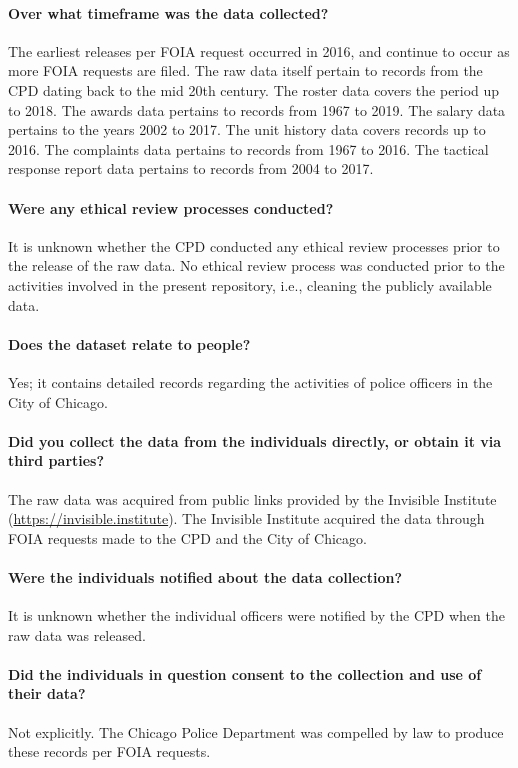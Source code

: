 \paragraph{Over what timeframe was the data collected?}
The earliest releases per FOIA request occurred in 2016, and continue to occur
as more FOIA requests are filed. The raw data itself pertain to records from the CPD
dating back to the mid 20th century. The roster data covers the period up
to 2018. The awards data pertains to records from 1967 to 2019.
The salary data pertains to the years 2002 to 2017. The unit history data covers records up
to 2016. The complaints data pertains to records from 1967 to 2016. The tactical response 
report data pertains to records from 2004 to 2017.

\paragraph{Were any ethical review processes conducted?}
It is unknown whether the CPD conducted any ethical review processes prior to the release
of the raw data. No ethical review process was conducted prior to the activities
involved in the present repository, i.e., cleaning the publicly available data.

\paragraph{Does the dataset relate to people?}
Yes; it contains detailed records regarding the activities of police officers in the City of Chicago.

\paragraph{Did you collect the data from the individuals directly, or obtain it via third parties?}
The raw data was acquired from public links provided by the Invisible Institute (\url{https://invisible.institute}).
The Invisible Institute acquired the data through FOIA requests made to the CPD and the City of Chicago.

\paragraph{Were the individuals notified about the data collection?}
It is unknown whether the individual officers were notified by the CPD when the raw data was released. 

\paragraph{Did the individuals in question consent to the collection and use of their data?}
Not explicitly. The Chicago Police Department was compelled by law to produce these records per FOIA requests.

